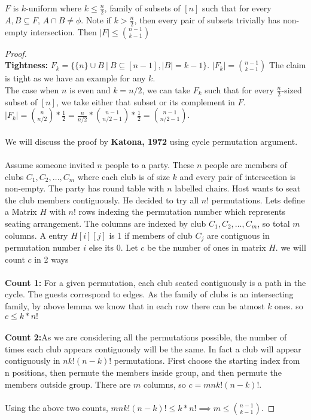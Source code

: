 \begin{theorem}
$F$ is $k$-uniform where $k\le \frac{n}{2}$, family of subsets of $[n]$ such that for every $A,B \subseteq F$, $A\cap B \neq \phi$. Note if $k> \frac{n}{2}$, then every pair of subsets trivially has non-empty intersection. Then $|F|\le {{n-1}\choose{k-1}}$

\begin{proof}\\
\textbf{Tightness:} $F_k=\{\{n\}\cup B ~|~ B\subseteq [n-1] ,|B|=k-1\}$. $|F_k|={{n-1}\choose{k-1}}$ The claim is tight as we have an example for any $k$.\\
The case when $n$ is even and $k=n/2$, we can take $F_k$ such that for every $\frac{n}{2}$-sized subset of $[n]$, we take either that subset or its complement in $F$. $|F_k|={{{n}\choose{n/2}}* \frac{1}{2}}=\frac{n}{n/2}* {{n-1}\choose n/2-1}* \frac{1}{2} = {{n-1}\choose{n/2-1}}$.\\\\
We will discuss the proof by \textbf{Katona, 1972} using cycle permutation argument.\\\\
Assume someone invited $n$ people to a party. These $n$ people are members of clubs $C_1, C_2, \hdots, C_m$ where each club is of size $k$ and every pair of intersection is non-empty. The party has round table with $n$ labelled chairs. Host wants to seat the club members contiguously. He decided to try all $n!$ permutations. Lets define a Matrix $H$ with $n!$ rows indexing the permutation number which represents seating arrangement. The columns are indexed by club $C_1, C_2, \hdots, C_m$, so total $m$ columns. A entry $H[i][j]$ is 1 if members of club $C_j$ are contiguous in permutation number $i$ else its 0. Let $c$ be the number of ones in matrix $H$. we will count $c$ in 2 ways\\\\
\textbf{Count 1:} For a given permutation, each club seated contiguously is a path in the cycle. The guests correspond to edges. As the family of clubs is an intersecting family, by above lemma we know that in each row there can be atmost $k$ ones. so $c \le k*n!$\\\\
\textbf{Count 2:}As we are considering all the permutations possible, the number of times each club appears contiguously will be the same. In fact a club will appear contiguously in $nk!(n-k)!$ permutations. First choose the starting index from n positions, then permute the members inside group, and then permute the members outside group. There are $m$ columns, so $c=mnk!(n-k)!$.\\\\
Using the above two counts, $mnk!(n-k)! \le k*n! \implies m \le {{n-1}\choose{k-1}}$.

\end{proof}
\end{theorem}
